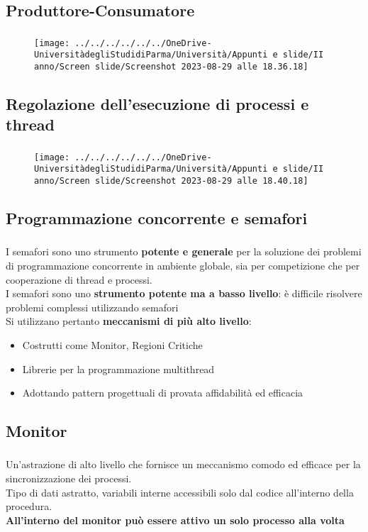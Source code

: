 \documentclass{beamer}
\newenvironment{mainframe}{
	\begin{frame}
		\frametitle{\insertsubsection}
		\framesubtitle{\insertsection}
	}{
	\end{frame}
}
\begin{document}
\subsection{Produttore-Consumatore}
\begin{mainframe}
	\begin{figure}
		\centering
		\texttt{[image: ../../../../../../OneDrive-UniversitàdegliStudidiParma/Università/Appunti e slide/II anno/Screen slide/Screenshot 2023-08-29 alle 18.36.18]}
	\end{figure}
\end{mainframe}
\subsection{Regolazione dell'esecuzione di processi e thread}
\begin{mainframe}
	\begin{figure}
		\centering
		\texttt{[image: ../../../../../../OneDrive-UniversitàdegliStudidiParma/Università/Appunti e slide/II anno/Screen slide/Screenshot 2023-08-29 alle 18.40.18]}
	\end{figure}
\end{mainframe}
\subsection{Programmazione concorrente e semafori}
\begin{mainframe}
	I semafori sono uno strumento \textbf{potente e generale} per la soluzione dei problemi di programmazione concorrente in ambiente globale, sia per competizione che per cooperazione di thread e processi.\\
	I semafori sono uno \textbf{strumento potente ma a basso livello}: è difficile risolvere problemi complessi utilizzando semafori\\
	Si utilizzano pertanto \textbf{meccanismi di più alto livello}:
	\begin{itemize}
		\item Costrutti come Monitor, Regioni Critiche
		\item Librerie per la programmazione multithread
		\item Adottando pattern progettuali di provata affidabilità ed efficacia
	\end{itemize}
\end{mainframe}
\subsection{Monitor}
\begin{mainframe}
	Un'astrazione di alto livello che fornisce un meccanismo comodo ed efficace per la sincronizzazione dei processi.\\
	Tipo di dati astratto, variabili interne accessibili solo dal codice all'interno della procedura.\\
\textbf{	All'interno del monitor può essere attivo un solo processo alla volta}
\end{mainframe}
\end{document}
